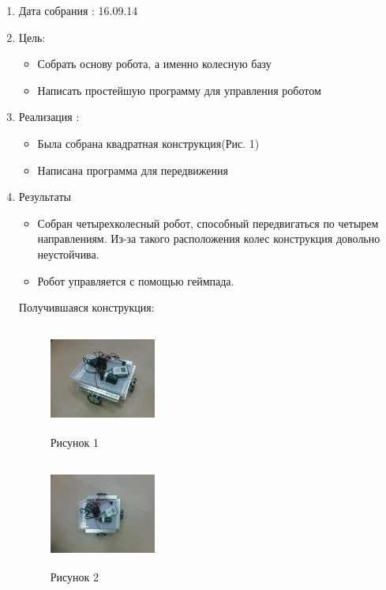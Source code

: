 
	\begin{enumerate}
		\item Дата собрания : 16.09.14
		\item Цель:
		\begin{itemize}
			\item Собрать основу робота, а именно колесную базу
			\item Написать простейшую программу для управления роботом
		\end{itemize}			
		\item Реализация :
		\begin{itemize}
			\item Была собрана квадратная конструкция(Рис. 1)
			\item Написана программа для передвижения
		\end{itemize}
		\item Результаты
		\begin{itemize}
			\item Собран четырехколесный робот, способный передвигаться по четырем направлениям. Из-за такого расположения колес конструкция довольно неустойчива.
			\item Робот управляется с помощью геймпада.
		\end{itemize}
		Получившаяся конструкция:
		\begin{figure} [h]
			\centering
			\begin{minipage}{0.3\linewidth}
				\includegraphics[width=35mm,height=35mm]{Days/16.09.14/1_1_robot.png}\\ Рисунок 1
			\end{minipage}
			\begin{minipage}{0.3\linewidth}
				\includegraphics[width=35mm,height=35mm]{Days/16.09.14/1_2_robot}\\ Рисунок 2
			\end{minipage}
		\end{figure}
	\end{enumerate}
\fillpage